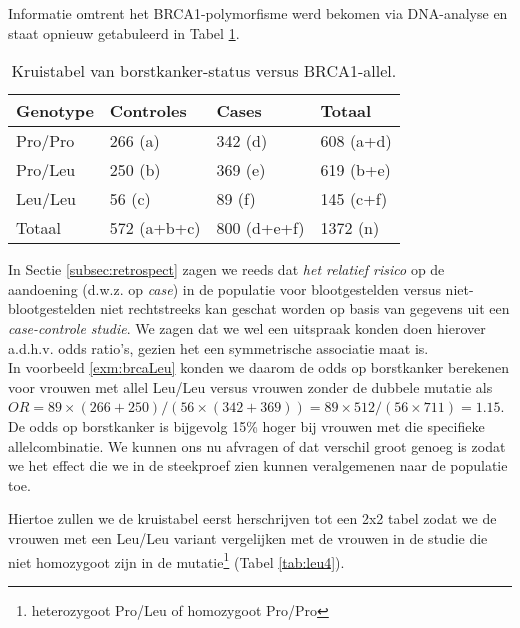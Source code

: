 \documentclass[12pt,dutch,coursenotes]{book}
\newenvironment{Shaded}{\begin{snugshade}}{\end{snugshade}}
\newcommand{\KeywordTok}[1]{\textcolor[rgb]{0.13,0.29,0.53}{\textbf{#1}}}
\newcommand{\StringTok}[1]{\textcolor[rgb]{0.31,0.60,0.02}{#1}}
\newcommand{\OperatorTok}[1]{\textcolor[rgb]{0.81,0.36,0.00}{\textbf{#1}}}
\newcommand{\NormalTok}[1]{#1}
\let\rmarkdownfootnote\footnote%
\def\footnote{\protect\rmarkdownfootnote}
\theoremstyle{definition}
\theoremstyle{definition}
\theoremstyle{definition}
\theoremstyle{remark}
\begin{document}
Informatie omtrent het BRCA1-polymorfisme werd bekomen via DNA-analyse
en staat opnieuw getabuleerd in Tabel \ref{tab:leu3}.

\begin{table}[t]

\caption{\label{tab:leu3}Kruistabel van borstkanker-status versus BRCA1-allel.}
\centering
\begin{tabular}{llll}
\toprule
Genotype & Controles & Cases & Totaal\\
\midrule
Pro/Pro & 266 (a) & 342 (d) & 608 (a+d)\\
Pro/Leu & 250 (b) & 369 (e) & 619 (b+e)\\
Leu/Leu & 56 (c) & 89 (f) & 145 (c+f)\\
Totaal & 572 (a+b+c) & 800 (d+e+f) & 1372 (n)\\
\bottomrule
\end{tabular}
\end{table}

In Sectie \ref{subsec:retrospect} zagen we reeds dat \emph{het relatief
risico} op de aandoening (d.w.z. op \emph{case}) in de populatie voor
blootgestelden versus niet-blootgestelden niet rechtstreeks kan geschat
worden op basis van gegevens uit een \emph{case-controle studie}. We
zagen dat we wel een uitspraak konden doen hierover a.d.h.v. odds
ratio's, gezien het een symmetrische associatie maat is.\\
In voorbeeld \ref{exm:brcaLeu} konden we daarom de odds op borstkanker
berekenen voor vrouwen met allel Leu/Leu versus vrouwen zonder de
dubbele mutatie als
\(OR=89\times (266+250)/(56\times (342+369))=89\times 512/(56 \times 711)=1.15\).
De odds op borstkanker is bijgevolg 15\% hoger bij vrouwen met die
specifieke allelcombinatie. We kunnen ons nu afvragen of dat verschil
groot genoeg is zodat we het effect die we in de steekproef zien kunnen
veralgemenen naar de populatie toe.

Hiertoe zullen we de kruistabel eerst herschrijven tot een 2x2 tabel
zodat we de vrouwen met een Leu/Leu variant vergelijken met de vrouwen
in de studie die niet homozygoot zijn in de mutatie\footnote{heterozygoot
  Pro/Leu of homozygoot Pro/Pro} (Tabel \ref{tab:leu4}).

\begin{Shaded}
\end{Shaded}
\end{document}
